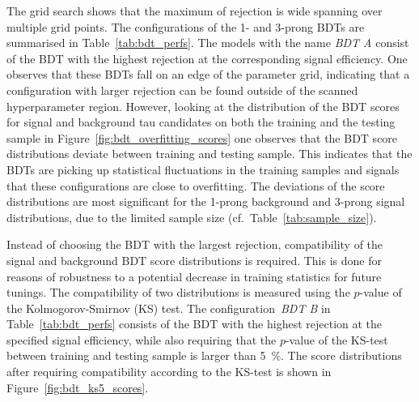 The grid search shows that the maximum of rejection is wide spanning over
multiple grid points. The configurations of the 1- and 3-prong BDTs are
summarised in Table~\ref{tab:bdt_perfs}. The models with the name \emph{BDT A}
consist of the BDT with the highest rejection at the corresponding signal
efficiency. One observes that these BDTs fall on an edge of the parameter grid,
indicating that a configuration with larger rejection can be found outside of
the scanned hyperparameter region. However, looking at the distribution of the
BDT scores for signal and background tau candidates on both the training and the
testing sample in Figure~\ref{fig:bdt_overfitting_scores} one observes that the
BDT score distributions deviate between training and testing sample. This
indicates that the BDTs are picking up statistical fluctuations in the training
samples and signals that these configurations are close to overfitting. The
deviations of the score distributions are most significant for the 1-prong
background and 3-prong signal distributions, due to the limited sample size
(cf.\ Table~\ref{tab:sample_size}).



Instead of choosing the BDT with the largest rejection, compatibility of the
signal and background BDT score distributions is required. This is done for
reasons of robustness to a potential decrease in training statistics for future
tunings. The compatibility of two distributions is measured using the $p$-value
of the Kolmogorov-Smirnov (KS) test. The configuration~\emph{BDT B} in
Table~\ref{tab:bdt_perfs} consists of the BDT with the highest rejection at the
specified signal efficiency, while also requiring that the $p$-value of the
KS-test between training and testing sample is larger than \SI{5}{\percent}. The
score distributions after requiring compatibility according to the KS-test is
shown in Figure~\ref{fig:bdt_ks5_scores}.

